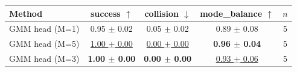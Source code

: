 \begin{tabular}{lcccc}
\toprule
Method & success $\uparrow$ & collision $\downarrow$ & mode\_balance $\uparrow$ & $n$ \\
\midrule
GMM head (M=1) & 0.95 $\pm$ 0.02 & 0.05 $\pm$ 0.02 & 0.89 $\pm$ 0.08 & 5 \\
GMM head (M=5) & \underline{1.00 $\pm$ 0.00} & \underline{0.00 $\pm$ 0.00} & \textbf{0.96 $\pm$ 0.04} & 5 \\
GMM head (M=3) & \textbf{1.00 $\pm$ 0.00} & \textbf{0.00 $\pm$ 0.00} & \underline{0.93 $\pm$ 0.06} & 5 \\
\bottomrule
\end{tabular}
